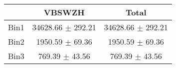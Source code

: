   \begin{tabular}{|c|c|c|}
  \hline
      & VBSWZH & Total \\ \cline{1-3} 
     \hline\hline
     Bin1 & 34628.66 $\pm$ 292.21 & 34628.66 $\pm$ 292.21 \\ \cline{1-3} 
     Bin2 & 1950.59 $\pm$ 69.36 & 1950.59 $\pm$ 69.36 \\ \cline{1-3} 
     Bin3 & 769.39 $\pm$ 43.56 & 769.39 $\pm$ 43.56 \\ \cline{1-3} 
  \end{tabular}
